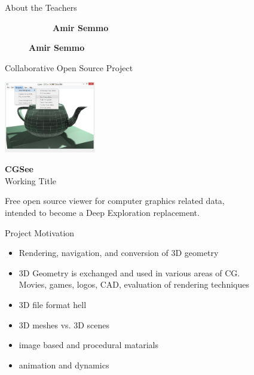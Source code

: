 \begin{frame}{About the Teachers}
\begin{figure}
\begin{subfigure}[b]{0.3\textwidth}
			\caption{\normalsize \textbf{Amir Semmo}}
		\end{subfigure}

	\end{figure}

\end{frame}



\begin{frame}[plain]
\end{frame}


\begin{frame}{Collaborative Open Source Project}
	
	\center
	
	\includegraphics[width=0.3\textwidth]{intro/mock_00}

	\Huge \textbf{CGSee}\\
	\smallskip
	\small Working Title
	\bigskip
	
	\Large
	Free open source viewer for computer graphics related data,\\intended to become a Deep Exploration replacement.

\end{frame}


\begin{frame}{Project Motivation}
	
	\begin{itemize}
		\item Rendering, navigation, and conversion of 3D geometry
		\bigskip
		\pause
		\item 3D Geometry is exchanged and used in various areas of CG.\\Movies, games, logos, CAD, evaluation of rendering techniques
		\bigskip
		\pause
		\item 3D file format hell %
		\item 3D meshes vs. 3D scenes %
		\item image based and procedural matarials
		\item animation and dynamics
	\end{itemize}

\end{frame}


